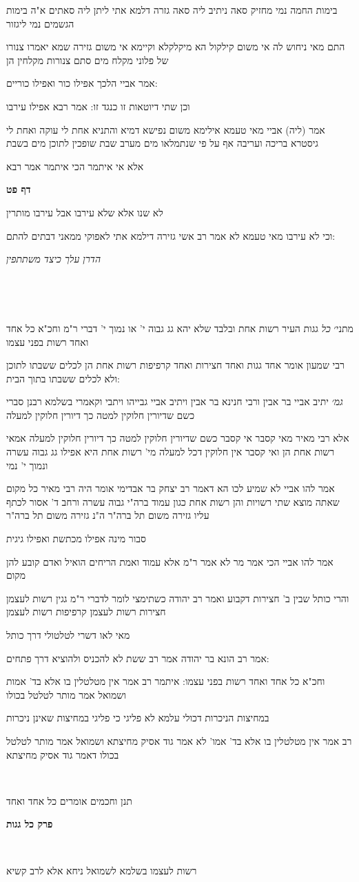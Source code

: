 \documentclass[12pt, openany]{book}
\newcommand{\sethebfont}{
\fontsize{10.5pt}{21.0pt} \selectfont
}
\newcommand{\textblock}[1]{
{\sethebfont #1\\}	
}
\newcommand{\chapname}{}
\newcommand{\sectname}{}
\newcommand{\newchap}[1]{
	\addcontentsline{toc}{chapter}{#1}
	\renewcommand{\chapname}{#1}
		\begin{center}
			\textbf{%
\fontsize{16pt}{16pt}\selectfont
				#1}
		\end{center}
}
\newcommand{\newsection}[1]{
	\addcontentsline{toc}{section}{#1}
	\renewcommand{\sectname}{#1}	
	\vspace{-\baselineskip}
	\begin{center}
		\textbf{%
\fontsize{16pt}{16pt}\selectfont
			#1}
	\end{center}
	\vspace{-\baselineskip}
	\nopagebreak
}
\begin{document}
\textblock{בימות החמה נמי מחזיק סאה ניתיב ליה סאה גזרה דלמא אתי ליתן ליה סאתים א"ה בימות הגשמים נמי ליגזור}
\textblock{התם מאי ניחוש לה אי משום קילקול הא מיקלקלא וקיימא אי משום גזירה שמא יאמרו צנורו של פלוני מקלח מים סתם צנורות מקלחין הן}
\textblock{אמר אביי הלכך אפילו כור ואפילו כוריים:}
\textblock{וכן שתי דיוטאות זו כנגד זו: אמר רבא אפילו עירבו}
\textblock{אמר (ליה) אביי מאי טעמא אילימא משום נפישא דמיא והתניא אחת לי עוקה ואחת לי גיסטרא בריכה ועריבה אף על פי שנתמלאו מים מערב שבת שופכין לתוכן מים בשבת}
\textblock{אלא אי איתמר הכי איתמר אמר רבא}
\newsection{דף פט}
\textblock{לא שנו אלא שלא עירבו אבל עירבו מותרין}
\textblock{וכי לא עירבו מאי טעמא לא אמר רב אשי גזירה דילמא אתי לאפוקי ממאני דבתים להתם:}
\textblock{\par \par {\large\emph{הדרן עלך כיצד משתתפין}}\par \par }
\textblock{}
\textblock{מתני׳ {\large\emph{כל}} גגות העיר רשות אחת ובלבד שלא יהא גג גבוה י' או נמוך י' דברי ר"מ וחכ"א כל אחד ואחד רשות בפני עצמו}
\textblock{רבי שמעון אומר אחד גגות ואחד חצירות ואחד קרפיפות רשות אחת הן לכלים ששבתו לתוכן ולא לכלים ששבתו בתוך הבית:}
\textblock{{\large\emph{גמ׳}} יתיב אביי בר אבין ורבי חנינא בר אבין ויתיב אביי גבייהו ויתבי וקאמרי בשלמא רבנן סברי כשם שדיורין חלוקין למטה כך דיורין חלוקין למעלה}
\textblock{אלא רבי מאיר מאי קסבר אי קסבר כשם שדיורין חלוקין למטה כך דיורין חלוקין למעלה אמאי רשות אחת הן ואי קסבר אין חלוקין דכל למעלה מי' רשות אחת היא אפילו גג גבוה עשרה ונמוך י' נמי}
\textblock{אמר להו אביי לא שמיע לכו הא דאמר רב יצחק בר אבדימי אומר היה רבי מאיר כל מקום שאתה מוצא שתי רשויות והן רשות אחת כגון עמוד ברה"י גבוה עשרה ורחב ד' אסור לכתף עליו גזירה משום תל ברה"ר ה"נ גזירה משום תל ברה"ר}
\textblock{סבור מינה אפילו מכתשת ואפילו גיגית}
\textblock{אמר להו אביי הכי אמר מר לא אמר ר"מ אלא עמוד ואמת הריחים הואיל ואדם קובע להן מקום}
\textblock{והרי כותל שבין ב' חצירות דקבוע ואמר רב יהודה כשתימצי לומר לדברי ר"מ גגין רשות לעצמן חצירות רשות לעצמן קרפיפות רשות לעצמן}
\textblock{מאי לאו דשרי לטלטולי דרך כותל}
\textblock{אמר רב הונא בר יהודה אמר רב ששת לא להכניס ולהוציא דרך פתחים:}
\textblock{וחכ"א כל אחד ואחד רשות בפני עצמו: איתמר רב אמר אין מטלטלין בו אלא בד' אמות ושמואל אמר מותר לטלטל בכולו}
\textblock{במחיצות הניכרות דכולי עלמא לא פליגי כי פליגי במחיצות שאינן ניכרות}
\textblock{רב אמר אין מטלטלין בו אלא בד' אמו' לא אמר גוד אסיק מחיצתא ושמואל אמר מותר לטלטל בכולו דאמר גוד אסיק מחיצתא}
\textblock{}
\textblock{תנן וחכמים אומרים כל אחד ואחד}
\newchap{פרק \quad כל גגות}
\textblock{}
\textblock{רשות לעצמו בשלמא לשמואל ניחא אלא לרב קשיא}
\end{document}
